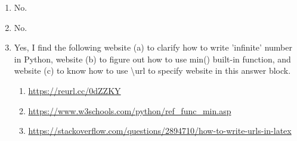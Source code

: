 \documentclass[11pt,addpoints,answers]{exam}
\begin{document}
\begin{your_solution}[height=6cm]
\begin{enumerate}
    \item No.
    \item No.
    \item Yes, I find the following website (a) to clarify how to write 'infinite' number in Python, website (b) to figure out how to use min() built-in function, and website (c) to know how to use \textbackslash{url} to specify website in this answer block.
    \begin{enumerate}
    	\item \url{https://reurl.cc/0dZZKY}
	\item \url{https://www.w3schools.com/python/ref_func_min.asp}
	\item \url{https://stackoverflow.com/questions/2894710/how-to-write-urls-in-latex}
   \end{enumerate}
\end{enumerate}
\end{your_solution}
\end{document}
